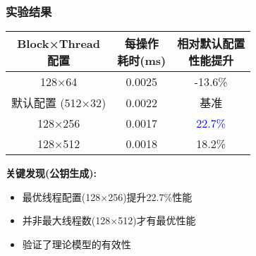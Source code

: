 \documentclass[slide]{../../custom}
\begin{document}
\begin{frame}
  \frametitle{实验结果}
  \centering
  \begin{tabular}{ccc}
    \toprule
    \makecell{\textbf{Block×Thread}\\\textbf{配置}} & \makecell{\textbf{每操作}\\\textbf{耗时(ms)}} & \makecell{\textbf{相对默认配置}\\\textbf{性能提升}} \\
    \midrule
    128×64 & 0.0025 & -13.6\% \\
    默认配置 (512×32) \cite{Wang2025} & 0.0022 & 基准 \\
    128×256 & 0.0017 & \textcolor{blue}{22.7\%} \\
    128×512 & 0.0018 & 18.2\% \\
    \bottomrule
  \end{tabular}

  \vspace{0.5cm}
  \textbf{关键发现(公钥生成):}
  \begin{itemize}
    \item 最优线程配置(128×256)提升22.7\%性能
    \item 并非最大线程数(128×512)才有最优性能
    \item 验证了理论模型的有效性
  \end{itemize}
\end{frame}



\end{document}
